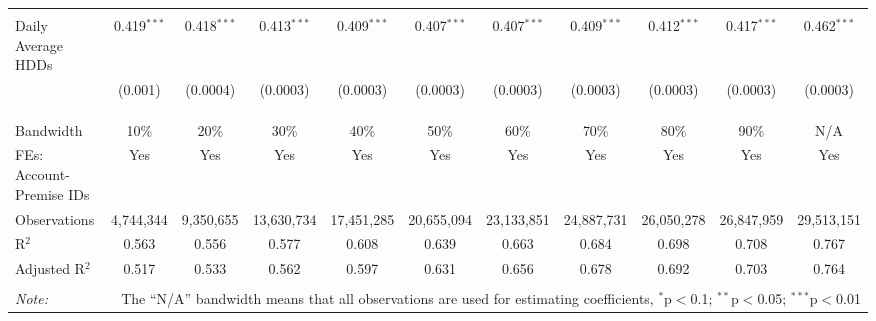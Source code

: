 \begin{table}[!htbp]
\begin{adjustbox}{scale = 0.9}
\begin{tabular}{@{\extracolsep{5pt}}lcccccccccc}
  & & & & & & & & & & \\ 
 Daily Average HDDs & 0.419$^{***}$ & 0.418$^{***}$ & 0.413$^{***}$ & 0.409$^{***}$ & 0.407$^{***}$ & 0.407$^{***}$ & 0.409$^{***}$ & 0.412$^{***}$ & 0.417$^{***}$ & 0.462$^{***}$ \\ 
  & (0.001) & (0.0004) & (0.0003) & (0.0003) & (0.0003) & (0.0003) & (0.0003) & (0.0003) & (0.0003) & (0.0003) \\ 
  & & & & & & & & & & \\ 
  & & & & & & & & & & \\ 
\hline \\[-1.8ex] 
Bandwidth & 10\% & 20\% & 30\% & 40\% & 50\% & 60\% & 70\% & 80\% & 90\% & N/A \\ 
FEs: Account-Premise IDs & Yes & Yes & Yes & Yes & Yes & Yes & Yes & Yes & Yes & Yes \\ 
Observations & 4,744,344 & 9,350,655 & 13,630,734 & 17,451,285 & 20,655,094 & 23,133,851 & 24,887,731 & 26,050,278 & 26,847,959 & 29,513,151 \\ 
R$^{2}$ & 0.563 & 0.556 & 0.577 & 0.608 & 0.639 & 0.663 & 0.684 & 0.698 & 0.708 & 0.767 \\ 
Adjusted R$^{2}$ & 0.517 & 0.533 & 0.562 & 0.597 & 0.631 & 0.656 & 0.678 & 0.692 & 0.703 & 0.764 \\ 
\hline 
\hline \\[-1.8ex] 
\textit{Note:}  & \multicolumn{10}{r}{The ``N/A'' bandwidth means that all observations are used for estimating coefficients, $^{*}$p$<$0.1; $^{**}$p$<$0.05; $^{***}$p$<$0.01} \\ 
\end{tabular}

\end{adjustbox}

\end{table} 
